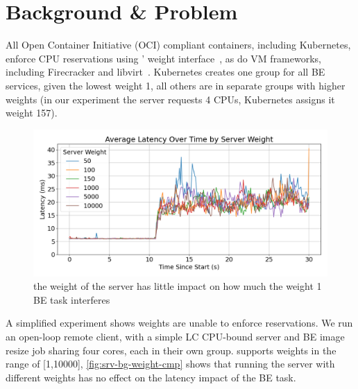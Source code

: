 
\section{Background \& Problem}

All Open Container Initiative (OCI) compliant containers, including Kubernetes,
enforce CPU reservations using \cgroups{}' weight interface~\cite{oci-cgroups,
docker-docs-cgroups, container-isolation-article}, as do VM frameworks,
including Firecracker and
libvirt~\cite{firecracker-cgroups,afaas,libvirt-cgroups}. Kubernetes creates one
group for all BE services, given the lowest weight 1, all others are in separate
groups with higher weights (in our experiment the server requests 4 CPUs,
Kubernetes assigns it weight 157).

\begin{figure}[t]
    \centering
    \includegraphics[width=\columnwidth]{graphs/srv-bg-weight-cmp-low.png}
    \caption{ the weight of the server has little impact on how much the
    weight 1 BE task interferes }\label{fig:srv-bg-weight-cmp}
\end{figure}


A simplified experiment shows \cgroups{} weights are unable to enforce
reservations. We run an open-loop remote client, with a simple LC CPU-bound
server and BE image resize job sharing four cores, each in their own group.
\cgroups{} supports weights in the range of [1,10000],
\autoref{fig:srv-bg-weight-cmp} shows that running the server with different
weights has no effect on the latency impact of the BE task.

